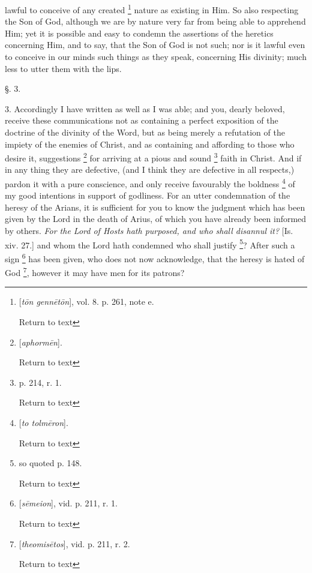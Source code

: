 lawful to conceive of any created \footnote{[\emph{t\={o}n genn\={e}t\={o}n}], vol. 8. p. 261, note e.

Return to text} nature as existing in Him. So also respecting the Son of God,
although we are by nature very far from being able to apprehend Him;
yet it is possible and easy to condemn the assertions of the heretics
concerning Him, and to say, that the Son of God is not such; nor is it
lawful even to conceive in our minds such things as they speak,
concerning His divinity; much less to utter them with the lips.

§. 3.

3. Accordingly I have written as well as I was
able; and you, dearly beloved, receive these communications not as
containing a perfect exposition of the doctrine of the divinity of the
Word, but as being merely a refutation of the impiety of the enemies
of Christ, and as containing and affording to those who desire it,
suggestions \footnote{[\emph{aphorm\={e}n}].

Return to text} for
arriving at a pious and sound \footnote{p. 214, r. 1.

Return to text} faith in Christ. And if in any thing they are defective, (and I
think they are defective in all respects,) pardon it with a pure
conscience, and only receive favourably the boldness \footnote{[\emph{to tolm\={e}ron}].

Return to text} of my good intentions in support of godliness. For an utter
condemnation of the heresy of the Arians, it is sufficient for you to
know the judgment which has been given by the Lord in the death of
Arius, of which you have already been informed by others. \emph{For the
Lord of Hosts hath purposed, and who shall disannul it?} [Is. xiv.
27.] and whom the Lord hath condemned who shall justify \footnote{so quoted p. 148.

Return to text}? After such a sign \footnote{[\emph{s\={e}meion}], vid. p. 211, r. 1.

Return to text}
has been given, who does not now acknowledge, that the heresy is hated
of God \footnote{[\emph{theomis\={e}tos}], vid. p. 211, r. 2.

Return to text}, however it
may have men for its patrons?

